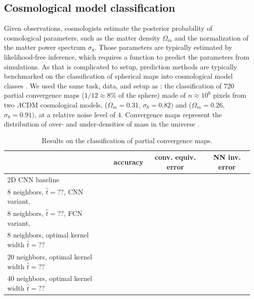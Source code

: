 \documentclass{article} %
\newcommand{\todo}[1]{{\color[rgb]{.6,.1,.6}{#1}}}
\begin{document}

\subsection{Cosmological model classification} \label{sec:exp:cosmo}

Given observations, cosmologists estimate the posterior probability of cosmological parameters, such as the matter density $\Omega_m$ and the normalization of the matter power spectrum $\sigma_8$.
Those parameters are typically estimated by likelihood-free inference, which requires a function to predict the parameters from simulations.
As that is complicated to setup, prediction methods are typically benchmarked on the classification of spherical maps into cosmological model classes \citep{schmelze2017cosmologicalmodel}.
We used the same task, data, and setup as \citet{perraudin2019deepspherecosmo}: the classification of $720$ partial convergence maps ($1/12 \approx 8\%$ of the sphere) made of $n \approx 10^6$ pixels from two $\Lambda$CDM cosmological models, ($\Omega_m = 0.31$, $\sigma_8 = 0.82)$ and ($\Omega_m = 0.26$, $\sigma_8 = 0.91)$, at a relative noise level of $4$.
Convergence maps represent the distribution of over- and under-densities of mass in the universe \citep[see][for a review of gravitational lensing]{bartelman2010gravitationallensing}.

\todo{Graph (\#neighbors), network architecture (info in the appendix, set the notation in the method section), loss, hyper-parameters. Or leave in appendix.}

\begin{table}
    \centering
    \begin{tabular}{l c c c}
		\toprule
		& accuracy & conv. equiv. error & NN inv. error \\
		\midrule
		2D CNN baseline \citep{perraudin2019deepspherecosmo} & \todo{??} & \todo{can we?} \\
		8 neighbors, $\hat{t} = ??$, CNN variant, \citep{perraudin2019deepspherecosmo} & \todo{??} & \todo{??} \\
		8 neighbors, $\hat{t} = ??$, FCN variant, \citep{perraudin2019deepspherecosmo} & \todo{??} & \todo{??} \\
		8 neighbors, optimal kernel width $\hat{t} = ??$ & \todo{??} & \todo{??} \\
		20 neighbors, optimal kernel width $\hat{t} = ??$ & \todo{??} & \todo{??} \\
		40 neighbors, optimal kernel width $\hat{t} = ??$ & \todo{??} & \todo{??} \\
		\bottomrule
    \end{tabular}
	\caption{
		Results on the classification of partial convergence maps.
		\todo{While extreme non-equivariance (the 2D CNN baseline) penalizes performance, improving equivariance doesn't improve performance.}
	}
    \label{tab:cosmo}
\end{table}
\end{document}

